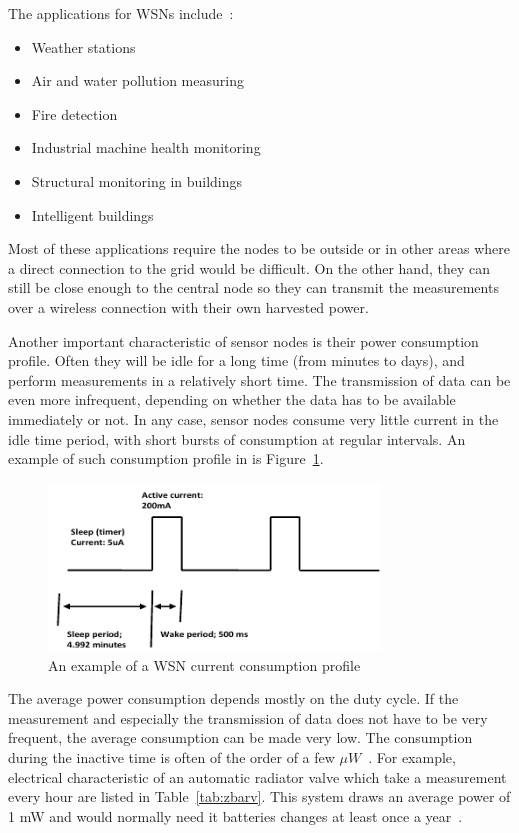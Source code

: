 \documentclass[a4paper,10pt]{article}
\begin{document}
The applications for \acp{WSN} include~\cite{wiki:eh}:
\begin{itemize}
  \item Weather stations
  \item Air and water pollution measuring
  \item Fire detection
  \item Industrial machine health monitoring
  \item Structural monitoring in buildings
  \item Intelligent buildings~\cite{cap-wsn-ieee}
\end{itemize}

Most of these applications require the nodes to be outside or in other areas where a direct connection to the grid would be difficult. On the other hand, they can still be close enough to the central node so they can transmit the measurements over a wireless connection with their own harvested power. 

Another important characteristic of sensor nodes is their power consumption profile. Often they will be idle for a long time (from minutes to days), and perform measurements in a relatively short time. The transmission of data can be even more infrequent, depending on whether the data has to be available immediately or not. In any case, sensor nodes consume very little current in the idle time period, with short bursts of consumption at regular intervals. An example of such consumption profile in is Figure~\ref{fig:wsn-consumption}. 

\begin{figure}[h]
\centering
 \includegraphics[width=250pt]{./Slike/wsn-current-profile}
 \caption{An example of a \ac{WSN} current consumption profile~\cite{cap-wsn-ieee}}
\label{fig:wsn-consumption}
\end{figure}

The average power consumption depends mostly on the duty cycle. If the measurement and especially the transmission of data does not have to be very frequent, the average consumption can be made very low. The consumption during the inactive time is often of the order of a few $\mu W$~\cite{Salerno10}. For example, electrical characteristic of an automatic radiator valve which take a measurement every hour are listed in Table~\ref{tab:zbarv}. This system draws an average power of 1 mW and would normally need it batteries changes at least once a year~\cite{teg-wsn-ieee}. 
\end{document}
